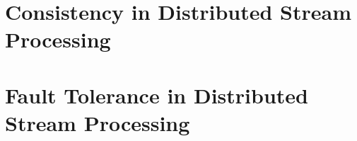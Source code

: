 \section{Consistency in Distributed Stream Processing}
\label{consistency_overview}


\section{Fault Tolerance in Distributed Stream Processing}
\label{phd-related-fault-tolerance}
